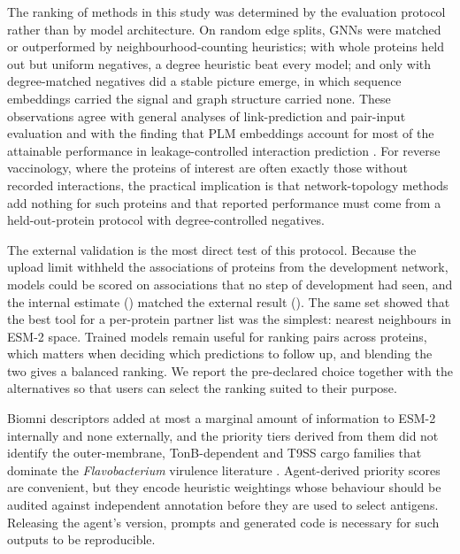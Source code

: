 \documentclass[pdflatex,sn-mathphys-num]{sn-jnl}
\begin{document}
The ranking of methods in this study was determined by the evaluation protocol rather than by model architecture. On random edge splits, GNNs were matched or outperformed by neighbourhood-counting heuristics; with whole proteins held out but uniform negatives, a degree heuristic beat every model; and only with degree-matched negatives did a stable picture emerge, in which sequence embeddings carried the signal and graph structure carried none. These observations agree with general analyses of link-prediction and pair-input evaluation \cite{park2012flaw,li2023linkpitfalls,bernett2024cracking} and with the finding that PLM embeddings account for most of the attainable performance in leakage-controlled interaction prediction \cite{reim2025plateau}. For reverse vaccinology, where the proteins of interest are often exactly those without recorded interactions, the practical implication is that network-topology methods add nothing for such proteins and that reported performance must come from a held-out-protein protocol with degree-controlled negatives.

The external validation is the most direct test of this protocol. Because the upload limit withheld the associations of \nNeverSubmitted{} proteins from the development network, models could be scored on associations that no step of development had seen, and the internal estimate (\cvFullRankAUC) matched the external result (\extPooledAUC). The same set showed that the best tool for a per-protein partner list was the simplest: nearest neighbours in ESM-2 space. Trained models remain useful for ranking pairs across proteins, which matters when deciding which predictions to follow up, and blending the two gives a balanced ranking. We report the pre-declared choice together with the alternatives so that users can select the ranking suited to their purpose.

Biomni descriptors added at most a marginal amount of information to ESM-2 internally and none externally, and the priority tiers derived from them did not identify the outer-membrane, TonB-dependent and T9SS cargo families that dominate the \textit{Flavobacterium} virulence literature \cite{li2017t9ss,thunes2021t9ss}. Agent-derived priority scores are convenient, but they encode heuristic weightings whose behaviour should be audited against independent annotation before they are used to select antigens. Releasing the agent's version, prompts and generated code is necessary for such outputs to be reproducible.
\end{document}
